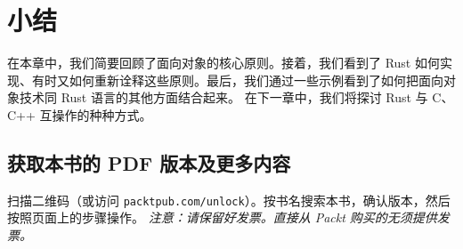 \section{小结}
在本章中，我们简要回顾了面向对象的核心原则。接着，我们看到了 Rust 如何实现、有时又如何重新诠释这些原则。最后，我们通过一些示例看到了如何把面向对象技术同 Rust 语言的其他方面结合起来。
在下一章中，我们将探讨 Rust 与 C、C++ 互操作的种种方式。
\begin{samepage}
\subsection{获取本书的 PDF 版本及更多内容}
扫描二维码（或访问 \texttt{packtpub.\allowbreak{}com/\allowbreak{}unlock}）。按书名搜索本书，确认版本，然后按照页面上的步骤操作。
\emph{注意：请保留好发票。直接从 Packt 购买的无须提供发票。}
\end{samepage}
